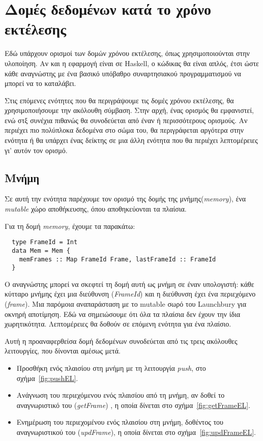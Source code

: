 \documentclass[diploma]{softlab-thesis}
\begin{document}
\section{Δομές δεδομένων κατά το χρόνο εκτέλεσης}

Εδώ υπάρχουν ορισμοί των δομών χρόνου εκτέλεσης, όπως χρησιμοποιούνται στην υλοποίηση. Αν και η εφαρμογή είναι σε Haskell, ο κώδικας θα είναι απλός, έτσι ώστε κάθε αναγνώστης με ένα βασικό υπόβαθρο 
συναρτησιακού προγραμματισμού να μπορεί να το καταλάβει.

Στις επόμενες ενότητες που θα περιγράψουμε τις δομές χρόνου εκτέλεσης, θα χρησιμοποιήσουμε την ακόλουθη σύμβαση. Στην αρχή, ένας ορισμός
θα εμφανιστεί, ενώ στξ συνέχια πιθανώς θα συνοδεύεται από έναν ή περισσότερους ορισμούς. Αν περιέχει πιο πολύπλοκα δεδομένα στο σώμα του, θα 
περιγράφεται αργότερα στην ενότητα ή θα υπάρχει ένας δείκτης σε μια άλλη ενότητα που θα περιέχει λεπτομέρειες γι' αυτόν τον ορισμό.

\subsection{Μνήμη}

Σε αυτή την ενότητα παρέχουμε τον ορισμό της δομής της μνήμης(\textit{memory}), ένα \textit{mutable} χώρο αποθήκευσης, 
όπου αποθηκεύονται τα πλαίσια.


Για τη δομή \textit{memory}, έχουμε τα παρακάτω:
\begin{verbatim}
  type FrameId = Int
  data Mem = Mem {
    memFrames :: Map FrameId Frame, lastFrameId :: FrameId
  }
\end{verbatim}

Ο αναγνώστης μπορεί να σκεφτεί τη δομή αυτή ως μνήμη σε έναν υπολογιστή: κάθε κύτταρο μνήμης έχει μια διεύθυνση (\textit{FrameId}) και
η διεύθυνση έχει ένα περιεχόμενο (\textit{frame}). Μια παρόμοια αναπαράσταση με το mutable σωρό του Launchbury για οκνηρή αποτίμηση.
Εδώ να σημειώσουμε ότι όλα τα πλαίσια δεν έχουν την ίδια χωρητικότητα. Λεπτομέρειες θα δοθούν σε επόμενη ενότητα για ένα πλαίσιο.


Αυτή η προαναφερθείσα δομή δεδομένων συνοδεύεται από τις τρεις ακόλουθες λειτουργίες, που δίνονται αμέσως μετά. 
\begin{itemize}
  \item Προσθήκη ενός πλαισίου στη μνήμη με τη λειτουργία \textit{push}, στο σχήμα~\ref{fig:pushEL}.
  \item Ανάγνωση του περιεχόμενου ενός πλαισίου από τη μνήμη, αν δοθεί το αναγνωριστικό του (\textit{getFrame})
  , η οποία δίνεται στο σχήμα~\ref{fig:getFrameEL}.
  \item Ενημέρωση του περιεχομένου ενός πλαισίου στη μνήμη,
  δοθέντος του αναγνωριστικού του (\textit{updFrame}), η οποία δίνεται στο σχήμα~\ref{fig:updFrameEL}.
\end{itemize}
\end{document}
